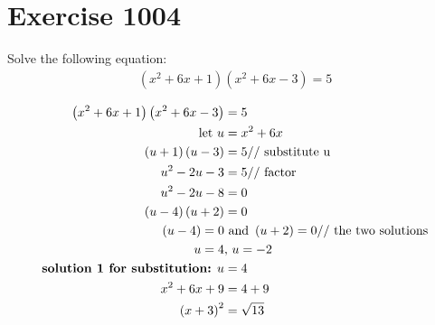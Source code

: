 \documentclass{article}
\begin{document}


\section{Exercise 1004}

Solve the following equation:
\begin{align*}
	\left( x^2 + 6x + 1\right)\left( x^2 + 6x - 3 \right) = 5
\end{align*}

\begin{align*}
	\left( x^2 + 6x + 1\right)\left( x^2 + 6x - 3 \right) & = 5                                                                \\
	\text{ let } u                                        & = x^2 + 6x                                                         \\
	\left( u + 1 \right)\left(u - 3\right)                & = 5 \text{// substitute u}                                         \\
	u^2 - 2u - 3                                          & = 5 \text{// factor}                                               \\
	u^2 - 2u - 8                                          & = 0                                                                \\
	\left( u - 4 \right)\left( u + 2 \right)              & = 0                                                                \\
	\left( u - 4 \right) = 0                              & \text{ and } \left( u + 2 \right) = 0 \text{// the two solutions } \\
	u = 4                                                 & \text{, } u = -2                                                   \\
	\text{ \textbf{solution 1 for substitution:} } u      & = 4                                                                \\
	x^2 + 6x + 9                                          & = 4 + 9                                                            \\
	\left( x + 3 \right)^2                                & = \sqrt{13}                                                        \\

\end{align*}
\end{document}
